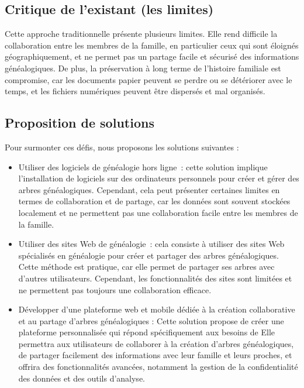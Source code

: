 \subsection{Critique de l'existant (les limites)}
Cette approche traditionnelle présente plusieurs limites. Elle rend difficile
la collaboration entre les membres de la famille, en particulier ceux qui sont
éloignés géographiquement, et ne permet pas un partage facile et sécurisé des
informations généalogiques. De plus, la préservation à long terme de l’histoire
familiale est compromise, car les documents papier peuvent se perdre ou se
détériorer avec le temps, et les fichiers numériques peuvent être dispersés et mal organisés.

\subsection{Proposition de solutions}
Pour surmonter ces défis, nous proposons les solutions suivantes :
\begin{itemize}
  \item  Utiliser des logiciels de généalogie hors ligne : cette solution implique
    l’installation de logiciels sur des ordinateurs personnels pour créer et gérer
    des arbres généalogiques. Cependant, cela peut présenter certaines limites
    en termes de collaboration et de partage, car les données sont souvent stockées
    localement et ne permettent pas une collaboration facile entre les membres de la famille.

  \item  Utiliser des sites Web de généalogie : cela consiste à
    utiliser des sites Web spécialisés en généalogie pour créer et partager des arbres
    généalogiques. Cette méthode est pratique, car elle permet de partager ses arbres
    avec d’autres utilisateurs. Cependant, les fonctionnalités des sites sont limitées et ne
    permettent pas toujours une collaboration efficace.

  \item Développer d’une plateforme web et mobile dédiée à la création
    collaborative et au partage d’arbres généalogiques : Cette solution propose
    de créer une plateforme personnalisée qui répond spécifiquement aux besoins de
    \firm Elle permettra aux utilisateurs de collaborer à la création d’arbres
    généalogiques, de partager facilement des informations avec leur famille et
    leurs proches, et offrira des fonctionnalités avancées, notamment la gestion
    de la confidentialité des données et des outils d’analyse.

\end{itemize}

